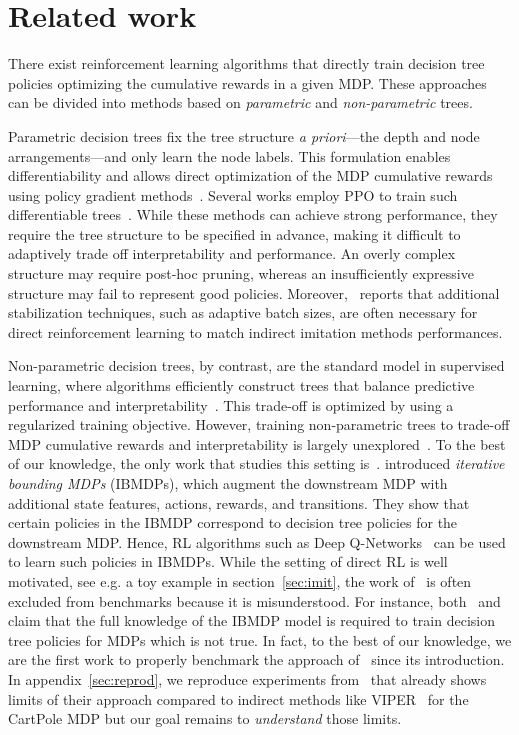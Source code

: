 \section{Related work}\label{sec:related-work-pomdp}
There exist reinforcement learning algorithms that directly train decision tree policies optimizing the cumulative rewards in a given MDP.
These approaches can be divided into methods based on \emph{parametric} and \emph{non-parametric} trees.

Parametric decision trees fix the tree structure \emph{a priori}—the depth and node arrangements—and only learn the node labels.
This formulation enables differentiability and allows direct optimization of the MDP cumulative rewards using policy gradient methods~\citep{pg_sutton}.
Several works employ PPO to train such differentiable trees~\citep{ppo,silva,vos2024optimizinginterpretabledecisiontree,sympol}.
While these methods can achieve strong performance, they require the tree structure to be specified in advance, making it difficult to adaptively trade off interpretability and performance.
An overly complex structure may require post-hoc pruning, whereas an insufficiently expressive structure may fail to represent good policies.
Moreover,~\cite{sympol} reports that additional stabilization techniques, such as adaptive batch sizes, are often necessary for direct reinforcement learning to match indirect imitation methods performances.

Non-parametric decision trees, by contrast, are the standard model in supervised learning, where algorithms efficiently construct trees that balance predictive performance and interpretability~\citep{breiman1984classification,oct}.
This trade-off is optimized by using a regularized training objective. However, training non-parametric trees to trade-off MDP cumulative rewards and interpretability is largely unexplored~\citep{milani-survey}.
To the best of our knowledge, the only work that studies this setting is~\cite{topin2021iterative}.
\cite{topin2021iterative} introduced \emph{iterative bounding MDPs} (IBMDPs), which augment the downstream MDP with additional state features, actions, rewards, and transitions.
They show that certain policies in the IBMDP correspond to decision tree policies for the downstream MDP. Hence, RL algorithms such as Deep Q-Networks~\citep{dqn} can be used to learn such policies in IBMDPs.
While the setting of direct RL is well motivated, see e.g. a toy example in section~\ref{sec:imit}, the work of~\cite{topin2021iterative} is often excluded from benchmarks because it is misunderstood.
For instance, both~\cite{vos2024optimizinginterpretabledecisiontree} and~\cite{laforest:hal-05197856} claim that the full knowledge of the IBMDP model is required to train decision tree policies for MDPs which is not true.
In fact, to the best of our knowledge, we are the first work to properly benchmark the approach of~\cite{topin2021iterative} since its introduction.
In appendix~\ref{sec:reprod}, we reproduce experiments from~\cite{topin2021iterative} that already shows limits of their approach compared to indirect methods like VIPER~\citep{viper} for the CartPole MDP but our goal remains to \textit{understand} those limits.

